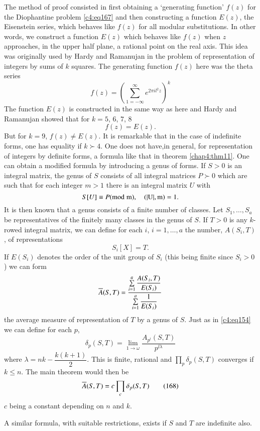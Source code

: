 The method of proof consisted in first obtaining a `generating
function' $f(z)$ for the Diophantine problem \eqref{c4:eq167} and then
constructing a function $E(z)$, the Eisenstein series, which behaves
like $f(z)$ for all modular substitutions. In other words, we
construct a function $E(z)$ which behaves like $f(z)$ when $z$
approaches, in the upper half plane, a rational point on the real
axis. This idea was originally used by Hardy and Ramanujan in the
problem of representation of integers by sums of $k$ squares. The
generating function $f(z)$ here was the theta series
$$
f(z)=\left(\sum^{\infty}_{1=-\infty}e^{2\pi il^{2}z}\right)^{k}
$$
The function $E(z)$ is constructed in the same way as here and Hardy
and Ramanujan showed that for $k=5$, $6$, $7$, $8$
$$
f(z)=E(z).
$$
But for $k=9$, $f(z)\neq E(z)$. It is remarkable that in the case of
indefinite forms, one has equality if $k \succ 4$. One does not
have,\pageoriginale in general, for representation of integers by
definite forms, a formula like that in theorem \ref{chap4:thm11}. One can
obtain a modified formula by introducing a genus of forms. If $S>0$ is
an integral matrix, the genus of $S$ consists of all integral matrices
$P \succ 0$ which are such that for each integer $m>1$ there is an integral
matrix $U$ with 
$$
S[U]\equiv P (\rm{mod} \; m),\quad (|U|,m)=1.
$$
It is then known that a genus consists of a finite number of
classes. Let $S_{1},\ldots,S_{a}$ be representatives of the finitely
many classes in the genus of $S$. If $T>0$ is any $k$-rowed integral
matrix, we can define for each $i$, $i=1,\ldots,a$ the number,
$A(S_{i},T)$, of representations
$$
S_{i}[X]=T.
$$
If $E(S_{i})$ denotes the order of the unit group of $S_{i}$ (this
being finite since $S_{i}>0$) we can form
$$
\overline{A}(S,T)=
\frac{\sum\limits^{a}_{i=1}\dfrac{A(S_{i},T)}{E(S_{i})}}{\sum\limits^{a}_{i=1}\dfrac{1}{E(S_{i})}} 
$$
the average measure of representation of $T$ by a genus of $S$. Just
as in \eqref{c4:eq154} we can define for each $p$,
$$
\delta_{p}(S,T)=\lim\limits_{1\to
  \omega}\frac{A_{p^{l}}(S,T)}{p^{l\lambda}}
$$
where $\lambda=nk-\dfrac{k(k+1)}{2}$. This is finite, rational and
$\prod\limits_{p}\delta_{p}(S,T)$ converges if $k\leq n$. The main
theorem would then be 
\begin{equation*}
\overline{A}(S,T)=c\prod_{c}\delta_{p}(S,T)\tag{168}\label{c4:eq168}
\end{equation*}\pageoriginale
$c$ being a constant depending on $n$ and $k$.

A similar formula, with suitable restrictions, exists if $S$ and $T$
are indefinite also.

